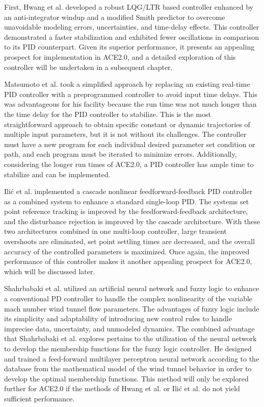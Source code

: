 First, Hwang et al. developed a robust LQG/LTR based controller enhanced by an anti-integrator windup and a modified Smith predictor to overcome unavoidable modeling errors, uncertainties, and time-delay effects. This controller demonstrated a faster stabilization and exhibited fewer oscillations in comparison to its PID counterpart. Given its superior performance, it presents an appealing prospect for implementation in ACE2.0, and a detailed exploration of this controller will be undertaken in a subsequent chapter.

Matsumoto et al. took a simplified approach by replacing an existing real-time PID controller with a preprogrammed controller to avoid input time delays. This was advantageous for his facility because the run time was not much longer than the time delay for the PID controller to stabilize. This is the most straightforward approach to obtain specific constant or dynamic trajectories of multiple input parameters, but it is not without its challenges. The controller must have a new program for each individual desired parameter set condition or path, and each program must be iterated to minimize errors. Additionally, considering the longer run times of ACE2.0, a PID controller has ample time to stabilize and can be implemented. 

Ili\'c et al. implemented a cascade nonlinear feedforward-feedback PID controller as a combined system to enhance a standard single-loop PID. The systems set point reference tracking is improved by the feedforward-feedback architecture, and the disturbance rejection is improved by the cascade architecture. With these two architectures combined in one multi-loop controller, large transient overshoots are eliminated, set point settling times are decreased, and the overall accuracy of the controlled parameters is maximized. Once again, the improved performance of this controller makes it another appealing prospect for ACE2.0, which will be discussed later.

Shahrbabaki et al. utilized an artificial neural network and fuzzy logic to enhance a conventional PD controller to handle the complex nonlinearity of the variable mach number wind tunnel flow parameters. The advantages of fuzzy logic include its simplicity and adaptability of introducing new control rules to handle imprecise data, uncertainty, and unmodeled dynamics. The combined advantage that Shahrbabaki et al. explores pertains to the utilization of the neural network to develop the membership functions for the fuzzy logic controller. He designed and trained a feed-forward multilayer perceptron neural network according to the database from the mathematical model of the wind tunnel behavior in order to develop the optimal membership functions. This method will only be explored further for ACE2.0 if the methods of Hwang et al. or Ili\'c et al. do not yield sufficient performance.


